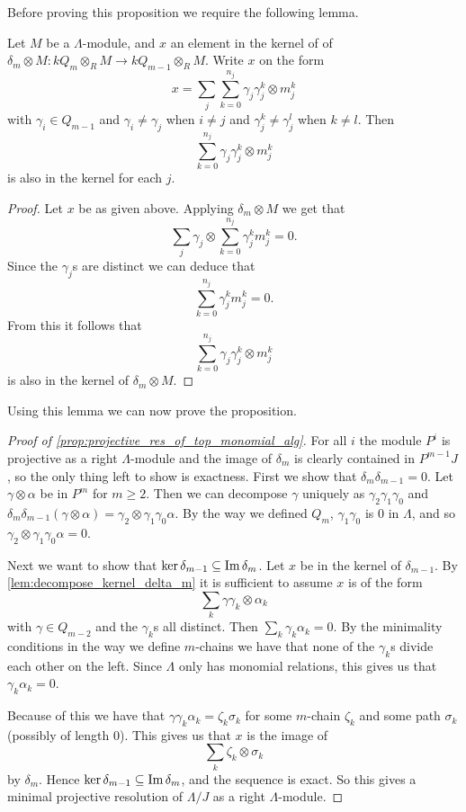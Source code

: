 Before proving this proposition we require the following lemma.

\begin{lemma}\cite[Lemma~2.1]{GKK91}\label{lem:decompose_kernel_delta_m}
	Let $M$ be a $\Lambda$-module, and $x$ an element in the kernel of of $\delta_m\otimes M\colon kQ_m\otimes_R M \to kQ_{m-1} \otimes_R M$. Write $x$ on the form
	$$x = \sum_j\sum_{k=0}^{n_j} \gamma_j  \gamma_j^k \otimes m_j^k$$
	with $\gamma_i \in Q_{m-1}$ and $\gamma_i \neq \gamma_j$ when $i \neq j$ and $\gamma_j^k \neq \gamma_j^l$  when $k \neq l$. Then 
	$$\sum_{k=0}^{n_j} \gamma_j  \gamma_j^k \otimes m_j^k$$
	is also in the kernel for each $j$.
	\begin{proof}
		Let $x$ be as given above. Applying $\delta_m\otimes M$ we get that 
		$$\sum_j \gamma_j \otimes \sum_{k=0}^{n_j} \gamma_j^{k}m_j^{k}=0.$$ 
		Since the $\gamma_j$s are distinct we can deduce that 
		$$ \sum_{k=0}^{n_j} \gamma_j^{k}m_j^{k}=0.$$ 
		From this it follows that
		$$\sum_{k=0}^{n_j} \gamma_j  \gamma_j^k \otimes m_j^k$$
		is also in the kernel of $\delta_m \otimes M$.
	\end{proof}
\end{lemma}

Using this lemma we can now prove the proposition.

\begin{proof}[Proof of \cref{prop:projective_res_of_top_monomial_alg}]
	For all $i$ the module $P^i$ is projective as a right $\Lambda$-module and the image of $\delta_m$ is clearly contained in $P^{m-1}J$, so the only thing left to show is exactness. First we show that $\delta_m\delta_{m-1}=0$. Let $\gamma\otimes \alpha$ be in $P^m$ for $m \geq 2$. Then we can decompose $\gamma$ uniquely as $\gamma_2\gamma_1\gamma_0$ and $\delta_m\delta_{m-1}(\gamma\otimes \alpha) = \gamma_2\otimes\gamma_1\gamma_0\alpha$. By the way we defined $Q_m$, $\gamma_1\gamma_0$ is 0 in $\Lambda$, and so $\gamma_2\otimes\gamma_1\gamma_0\alpha = 0$.
	
	Next we want to show that $\operatorname{ker}\delta_{m-1} \subseteq \operatorname{Im}\delta_m$. Let $x$ be in the kernel of $\delta_{m-1}$. By \cref{lem:decompose_kernel_delta_m} it is sufficient to assume $x$ is of the form
	$$\sum_k \gamma  \gamma_k \otimes \alpha_k$$
	with $\gamma \in Q_{m-2}$ and the $\gamma_k$s all distinct. Then $\sum_k \gamma_k\alpha_k = 0$. By the minimality conditions in the way we define $m$-chains we have that none of the $\gamma_k$s divide each other on the left. Since $\Lambda$ only has monomial relations, this gives us that $\gamma_{k}\alpha_{k}=0$.
	
	Because of this we have that $\gamma\gamma_k\alpha_k=\zeta_k\sigma_k$ for some $m$-chain $\zeta_k$ and some path $\sigma_k$ (possibly of length 0). This gives us that $x$ is the image of 
	$$\sum_k \zeta_k\otimes \sigma_k$$ 
	by $\delta_m$. Hence $\operatorname{ker}\delta_{m-1} \subseteq \operatorname{Im}\delta_m$, and the sequence is exact. So this gives a minimal projective resolution of $\Lambda/J$ as a right $\Lambda$-module.
\end{proof}

